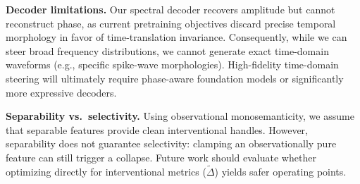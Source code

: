 \documentclass{article}
\begin{document}
\textbf{Decoder limitations.} Our spectral decoder recovers amplitude but cannot reconstruct phase, as current pretraining objectives discard precise temporal morphology in favor of time-translation invariance. Consequently, while we can steer broad frequency distributions, we cannot generate exact time-domain waveforms (e.g., specific spike-wave morphologies). High-fidelity time-domain steering will ultimately require phase-aware foundation models or significantly more expressive decoders.

\textbf{Separability vs.\ selectivity.} Using observational monosemanticity, we assume that separable features provide clean interventional handles. However, separability does not guarantee selectivity: clamping an observationally pure feature can still trigger a collapse. Future work should evaluate whether optimizing directly for interventional metrics ($\tilde{\Delta}$) yields safer operating points.



\end{document}
